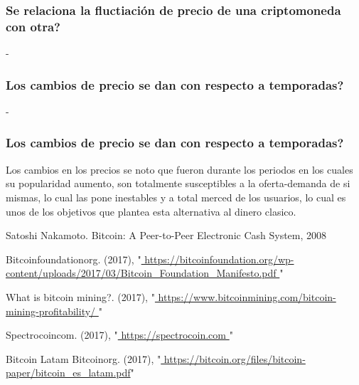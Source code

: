 \documentclass[12pt,letterpaper]{article}
\begin{document}
 	\subsubsection*{Se relaciona la fluctiaci\'on de precio de una criptomoneda con otra?}
-	\subsubsection*{Los cambios de precio se dan con respecto a temporadas?}
-
 	
	\subsubsection*{Los cambios de precio se dan con respecto a temporadas?}
	Los cambios en los precios se noto que fueron durante los periodos en los cuales su popularidad aumento, son totalmente susceptibles a la oferta-demanda de si mismas, lo cual las pone inestables y a total merced de los usuarios, lo cual es unos de los objetivos que plantea esta alternativa al dinero clasico.
 


\begin{thebibliography}{5}

Satoshi Nakamoto. Bitcoin: A Peer-to-Peer Electronic Cash System, 2008

Bitcoinfoundationorg. (2017),
"\url{ https://bitcoinfoundation.org/wp-content/uploads/2017/03/Bitcoin_Foundation_Manifesto.pdf }"


What is bitcoin mining?. (2017),
"\url{ https://www.bitcoinmining.com/bitcoin-mining-profitability/ }"


Spectrocoincom. (2017),
"\url{ https://spectrocoin.com }"


Bitcoin Latam
Bitcoinorg. (2017), 
 "\url{ https://bitcoin.org/files/bitcoin-paper/bitcoin_es_latam.pdf}"


\end{thebibliography}
\end{document}

